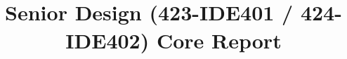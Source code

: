 \title{\ProjectName\\[0.5em]\large Senior Design (423-IDE401 / 424-IDE402) Core Report\\[1.5em]\normalsize\VERSION\\\DocumentStatus}
\author{\DocumentOwner\\\Organization}
\conferraldate{}{\DocumentDate}
\copyrightholder{\Organization}
\maketitle

\makecopyright

\cleardoublepage
\begin{abstract}
  
\end{abstract}



\contentspage
\tablelistpage
\figurelistpage
